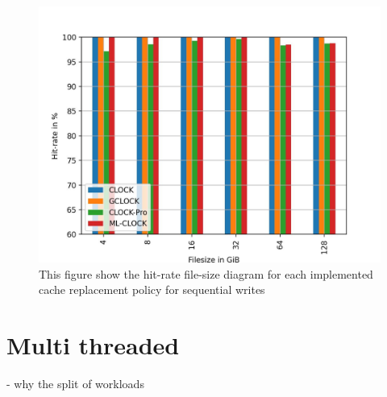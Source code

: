 \documentclass[
	12pt,
	a4paper,
	abstract,
	bibliography=totoc,
	chapterprefix,
	headings=openright,
	numbers=endperiod,
	parskip=half,
	twoside,
]{scrreprt}
\begin{document}
\begin{figure}[H]
	\centering
	\includegraphics[scale=0.45]{seq_write.jpg}		
	\caption{This figure show the hit-rate file-size diagram for each implemented 		cache replacement policy for sequential writes}
	\label{fig:seq write}
\end{figure}


\section{Multi threaded}

- why the split of workloads
\end{document}
